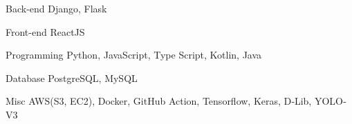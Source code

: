 

\begin{cvskills}

  \cvskill
    {Back-end} %
    {Django, Flask} %

  \cvskill
    {Front-end} %
    {ReactJS} %

  \cvskill
    {Programming}
    {Python, JavaScript, Type Script, Kotlin, Java}

  \cvskill
    {Database}
    {PostgreSQL, MySQL}

  \cvskill
    {Misc}
    {AWS(S3, EC2), Docker, GitHub Action, Tensorflow, Keras, D‐Lib, YOLO‐V3}

\end{cvskills}

